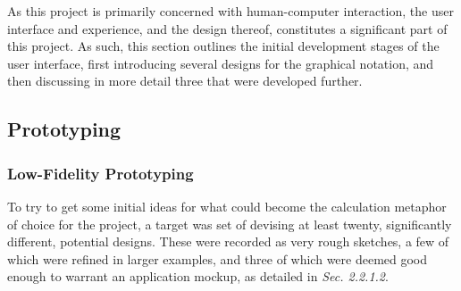 \documentclass[12pt,twoside,notitlepage,xetex]{report}
\begin{document}
As this project is primarily concerned with human-computer interaction, the
user interface and experience, and the design thereof, constitutes a
significant part of this project.  As such, this section outlines the initial
development stages of the user interface, first introducing several designs for
the graphical notation, and then discussing in more detail three that were
developed further.

\subsection{Prototyping}

\subsubsection{Low-Fidelity Prototyping}

To try to get some initial ideas for what could become the calculation metaphor
of choice for the project, a target was set of devising at least twenty,
significantly different, potential designs.  These were recorded as very rough
sketches, a few of which were refined in larger examples, and three of which
were deemed good enough to warrant an application mockup, as detailed in
\emph{Sec. 2.2.1.2}.


\end{document}
